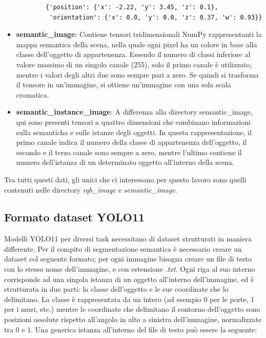 \documentclass[12pt]{report}
\begin{document}
\begin{itemize}
	\begin{verbatim}
		{'position': {'x': -2.22, 'y': 3.45, 'z': 0.1},
		 'orientation': {'x': 0.0, 'y': 0.0, 'z': 0.37, 'w': 0.93}}
	\end{verbatim}
	
	\item \textbf{semantic\_image}: Contiene tensori tridimensionali NumPy rappresentanti la mappa semantica della scena, nella quale ogni pixel ha un colore in base alla classe dell'oggetto di appartenenza. Essendo il numero di classi inferiore al valore massimo di un singolo canale (255), solo il primo canale è utilizzato, mentre i valori degli altri due sono sempre pari a zero. Se quindi si trasforma il tensore in un'immagine, si ottiene un'immagine con una sola scala cromatica.
	
	\item \textbf{semantic\_instance\_image}: A differenza alla directory semantic\_image, qui sono presenti tensori a quattro dimensioni che combinano informazioni sulla semanticha e sulle istanze degli oggetti. In questa rappresentazione, il primo canale indica il numero della classe di appartenenza dell'oggetto, il secondo e il terzo canale sono sempre a zero, mentre l'ultimo contiene il numero dell'istanza di un determinato oggetto all'interno della scena.
\end{itemize}

Tra tutti questi dati, gli unici che ci interessano per questo lavoro sono quelli contenuti nelle directory \textit{rgb\_image} e \textit{semantic\_image}.

\subsection{Formato dataset YOLO11}
\label{chap:formato_dataset_yolo_per_segmentazione}

Modelli YOLO11 per diversi task necessitano di dataset strutturati in maniera differente. Per il compito di segmentazione semantica è necessario creare un dataset col seguente formato; per ogni immagine bisogna creare un file di testo con lo stesso nome dell'immagine, e con estensione \textit{.txt}. Ogni riga al suo interno corrisponde ad una singola istanza di un oggetto all'interno dell'immagine, ed è strutturata in due parti: la classe dell'oggetto e le sue coordinate che lo delimitano. La classe è rappresentata da un intero (ad esempio 0 per le porte, 1 per i muri, etc.) mentre le coordinate che delimitano il contorno dell'oggetto sono posizioni assolute rispetto all'angolo in alto a sinistra dell'immagine, normalizzate tra 0 e 1. Una generica istanza all'interno del file di testo può essere la seguente:
\end{document}
